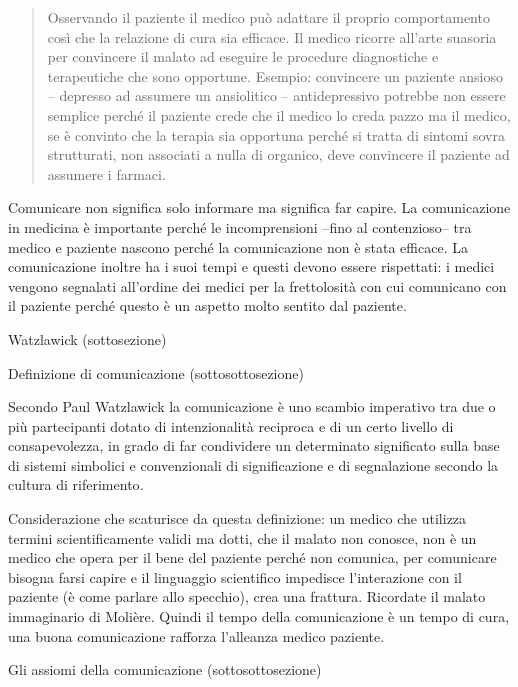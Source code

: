 \documentclass[]{article}
\begin{document}
\begin{quote}
Osservando il paziente il medico può adattare il proprio comportamento
così che la relazione di cura sia efficace. Il medico ricorre all'arte
suasoria per convincere il malato ad eseguire le procedure diagnostiche
e terapeutiche che sono opportune. Esempio: convincere un paziente
ansioso -- depresso ad assumere un ansiolitico -- antidepressivo
potrebbe non essere semplice perché il paziente crede che il medico lo
creda pazzo ma il medico, se è convinto che la terapia sia opportuna
perché si tratta di sintomi sovra strutturati, non associati a nulla di
organico, deve convincere il paziente ad assumere i farmaci.
\end{quote}

Comunicare non significa solo informare ma significa far capire. La
comunicazione in medicina è importante perché le incomprensioni --fino
al contenzioso­­-- tra medico e paziente nascono perché la comunicazione
non è stata efficace. La comunicazione inoltre ha i suoi tempi e questi
devono essere rispettati: i medici vengono segnalati all'ordine dei
medici per la frettolosità con cui comunicano con il paziente perché
questo è un aspetto molto sentito dal paziente.

Watzlawick (sottosezione)

Definizione di comunicazione (sottosottosezione)

Secondo Paul Watzlawick la comunicazione è uno scambio imperativo tra
due o più partecipanti dotato di intenzionalità reciproca e di un certo
livello di consapevolezza, in grado di far condividere un determinato
significato sulla base di sistemi simbolici e convenzionali di
significazione e di segnalazione secondo la cultura di
riferimento\emph{.}

Considerazione che scaturisce da questa definizione: un medico che
utilizza termini scientificamente validi ma dotti, che il malato non
conosce, non è un medico che opera per il bene del paziente perché non
comunica, per comunicare bisogna farsi capire e il linguaggio
scientifico impedisce l'interazione con il paziente (è come parlare allo
specchio), crea una frattura. Ricordate il malato immaginario di
Molière. Quindi il tempo della comunicazione è un tempo di cura, una
buona comunicazione rafforza l'alleanza medico paziente.

Gli assiomi della comunicazione (sottosottosezione)
\end{document}

